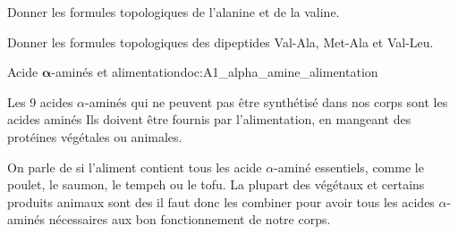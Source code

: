 \numeroQuestion
Donner les formules topologiques de l'alanine et de la valine.
\correction{
  \centering
  \chemfig{!\valine}  \qq{} \chemfig{!\alanine}
}
\pasCorrection{\vspace*{4cm}}

\numeroQuestion
Donner les formules topologiques des dipeptides Val-Ala, Met-Ala et Val-Leu.
\vfill

\begin{doc}{Acide $\mathbf{\alpha}$-aminés et alimentation}{doc:A1_alpha_amine_alimentation}
  \begin{importants}
    Les 9 acides $\alpha$-aminés qui ne peuvent pas être synthétisé dans nos corps sont les acides aminés 
    Ils doivent être fournis par l'alimentation, en mangeant des protéines végétales ou animales.
  \end{importants}
  
  On parle de  si l'aliment contient tous les acide $\alpha$-aminé essentiels, comme le poulet, le saumon, le tempeh ou le tofu.
  La plupart des végétaux et certains produits animaux sont des  il faut donc les combiner pour avoir tous les acides $\alpha$-aminés nécessaires aux bon fonctionnement de notre corps.
\end{doc}
